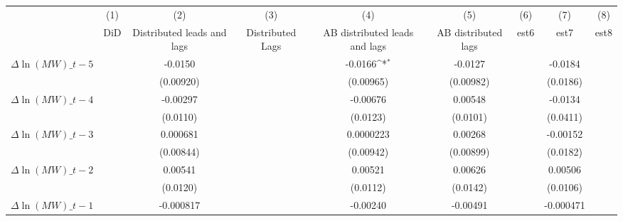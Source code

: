 {
\def\sym#1{\ifmmode^{#1}\else\(^{#1}\)\fi}
\begin{tabular}{l*{8}{c}}
\hline\hline
          &\multicolumn{1}{c}{(1)}&\multicolumn{1}{c}{(2)}&\multicolumn{1}{c}{(3)}&\multicolumn{1}{c}{(4)}&\multicolumn{1}{c}{(5)}&\multicolumn{1}{c}{(6)}&\multicolumn{1}{c}{(7)}&\multicolumn{1}{c}{(8)}\\
          &\multicolumn{1}{c}{DiD}&\multicolumn{1}{c}{Distributed leads and lags}&\multicolumn{1}{c}{Distributed Lags}&\multicolumn{1}{c}{AB distributed leads and lags}&\multicolumn{1}{c}{AB distributed lags}&\multicolumn{1}{c}{est6}&\multicolumn{1}{c}{est7}&\multicolumn{1}{c}{est8}\\
\hline
$\Delta \ln(MW)\_{t-5}$&                  &  -0.0150         &                  &  -0.0166\sym{*}  &  -0.0127         &                  &  -0.0184         &                  \\
          &                  &(0.00920)         &                  &(0.00965)         &(0.00982)         &                  & (0.0186)         &                  \\
[1em]
$\Delta \ln(MW)\_{t-4}$&                  & -0.00297         &                  & -0.00676         &  0.00548         &                  &  -0.0134         &                  \\
          &                  & (0.0110)         &                  & (0.0123)         & (0.0101)         &                  & (0.0411)         &                  \\
[1em]
$\Delta \ln(MW)\_{t-3}$&                  & 0.000681         &                  &0.0000223         &  0.00268         &                  & -0.00152         &                  \\
          &                  &(0.00844)         &                  &(0.00942)         &(0.00899)         &                  & (0.0182)         &                  \\
[1em]
$\Delta \ln(MW)\_{t-2}$&                  &  0.00541         &                  &  0.00521         &  0.00626         &                  &  0.00506         &                  \\
          &                  & (0.0120)         &                  & (0.0112)         & (0.0142)         &                  & (0.0106)         &                  \\
[1em]
$\Delta \ln(MW)\_{t-1}$&                  &-0.000817         &                  & -0.00240         & -0.00491         &                  &-0.000471         &                  \\

\end{tabular}}
